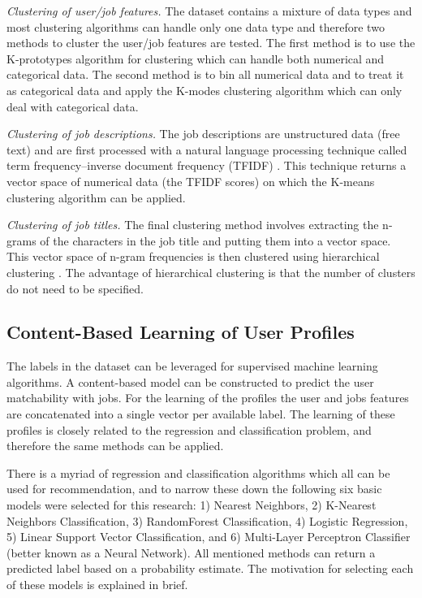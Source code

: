 \textit{Clustering of user/job features.}
The dataset contains a mixture of data types and most clustering algorithms can handle only one data type and therefore two methods to cluster the user/job features are tested.
The first method is to use the K-prototypes algorithm \cite{huang1997clustering} for clustering which can handle both numerical and categorical data. 
The second method is to bin all numerical data and to treat it as categorical data and apply the K-modes clustering algorithm \cite{huang1997clustering, huang1998extensions} which can only deal with categorical data. 

\textit{Clustering of job descriptions.}
The job descriptions are unstructured data (free text) and are first processed with a natural language processing technique called term frequency–inverse document frequency (TFIDF) \cite{ramos2003using}. 
This technique returns a vector space of numerical data (the TFIDF scores) on which the K-means clustering algorithm \cite{hartigan1979algorithm} can be applied. 

\textit{Clustering of job titles.}
The final clustering method involves extracting the n-grams of the characters in the job title and putting them into a vector space.
This vector space of n-gram frequencies is then clustered using hierarchical clustering \cite{rokach2005clustering}. 
The advantage of hierarchical clustering is that the number of clusters do not need to be specified. 

\subsection{Content-Based Learning of User Profiles}
\label{ssec:cblup}
The labels in the dataset can be leveraged for supervised machine learning algorithms. 
A content-based model can be constructed to predict the user matchability with jobs. 
For the learning of the profiles the user and jobs features are concatenated into a single vector per available label. 
The learning of these profiles is closely related to the regression and classification problem, and therefore the same methods can be applied. 

There is a myriad of regression and classification algorithms which all can be used for recommendation, and to narrow these down the following six basic models were selected for this research: 1) Nearest Neighbors, 2) K-Nearest Neighbors Classification, 3) RandomForest Classification, 4) Logistic Regression, 5) Linear Support Vector Classification, and 6) Multi-Layer Perceptron Classifier (better known as a Neural Network).
All mentioned methods can return a predicted label based on a probability estimate.
The motivation for selecting each of these models is explained in brief.

